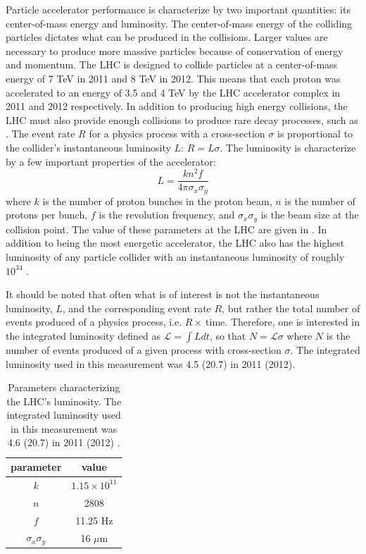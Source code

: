 Particle accelerator performance is characterize by two important quantities:
its center-of-mass energy and luminosity.
The center-of-mass energy of the colliding particles dictates what can
be produced in the collisions.
Larger values are necessary
to produce more massive particles because of conservation of energy and momentum. 
The LHC is designed to collide particles
at a center-of-mass energy of 7 TeV in 2011 and 8 TeV in 2012. This means
that each proton was accelerated to an energy of 3.5 and 4 TeV by the LHC
accelerator complex in 2011 and 2012 respectively. 
In addition to producing high energy collisions,
the LHC must also provide enough collisions to produce rare decay processes,
such as \HToZg.
The event rate $R$ for a physics process with a cross-section $\sigma$
is proportional to the collider's instantaneous luminosity $L$: $R = L\sigma$. 
The luminosity
is characterize by a few important properties of the accelerator:
\[
    L = \frac{k n^2 f}{4\pi \sigma_x \sigma_y}
\]
where $k$ is the number of proton bunches in the proton beam, 
$n$ is the number of protons per
bunch, $f$ is the revolution frequency, and $\sigma_x\sigma_y$ is the
beam size at the collision point. The value of these parameters at the
LHC are given in . In addition to being the most
energetic accelerator, the LHC also has the highest luminosity of any particle
collider with an instantaneous luminosity of roughly $10^{34}$  .

It should be noted that often what is of interest is not the instantaneous luminosity,
$L$, and the corresponding  event rate $R$, but rather the total number
of events produced of a physics process, i.e. $R \times ~\mathrm{time}$. Therefore,
one is interested in the integrated luminosity defined as 
$\mathcal{L} = \int L dt$, so that $N = \mathcal{L}\sigma$ where
$N$ is the number of events produced of a given process with cross-section $\sigma$.
The integrated luminosity used in this measurement was 4.5 (20.7) \fb in 2011 (2012).

\begin{table}[htbp]
  \begin{center}
    \begin{tabular}{cc}
    \hline\hline
    parameter & value  \\
    \hline
    $k$ &  $1.15 \times 10^{11}$ \\
    $n$ & 2808 \\
    $f$ & 11.25 Hz \\
    $\sigma_x\sigma_y$ &  16 $\mu$m\\
    \hline\hline
    \end{tabular}
    \caption{Parameters characterizing the LHC's luminosity. The integrated luminosity
    used in this measurement was 4.6 (20.7) \fb in 2011 (2012) \cite{LHCdesign}.}
    \label{tab:lhcparameters}
  \end{center}
\end{table}

